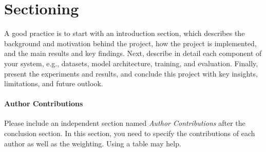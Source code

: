\section{Sectioning}
A good practice is to start with an introduction section, which describes the background and motivation behind the project, how the project is implemented, and the main results and key findings. Next, describe in detail each component of your system, e.g., datasets, model architecture, training, and evaluation. Finally, present the experiments and results, and conclude this project with key insights, limitations, and future outlook.

\paragraph{Author Contributions}
Please include an independent section named \textit{Author Contributions} after the conclusion section. In this section, you need to specify the contributions of each author as well as the weighting. Using a table may help.
